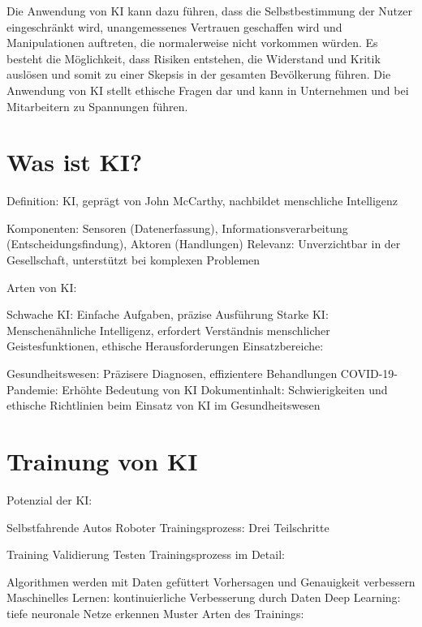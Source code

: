 \documentclass{article}
\begin{document}
\vspace{2mm}Die Anwendung von KI kann dazu führen, dass die Selbstbestimmung der Nutzer eingeschränkt wird, unangemessenes Vertrauen geschaffen wird und Manipulationen auftreten, die normalerweise nicht vorkommen würden. Es besteht die Möglichkeit, dass Risiken entstehen, die Widerstand und Kritik auslösen und somit zu einer Skepsis in der gesamten Bevölkerung führen. Die Anwendung von KI stellt ethische Fragen dar und kann in Unternehmen und bei Mitarbeitern zu Spannungen führen.



\section{Was ist KI?}

\vspace{2mm}Definition: KI, geprägt von John McCarthy, nachbildet menschliche Intelligenz

\vspace{2mm}Komponenten: Sensoren (Datenerfassung), Informationsverarbeitung (Entscheidungsfindung), Aktoren (Handlungen)
Relevanz: Unverzichtbar in der Gesellschaft, unterstützt bei komplexen Problemen

\vspace{2mm}Arten von KI:

\vspace{2mm}Schwache KI: Einfache Aufgaben, präzise Ausführung
Starke KI: Menschenähnliche Intelligenz, erfordert Verständnis menschlicher Geistesfunktionen, ethische Herausforderungen
Einsatzbereiche:

\vspace{2mm}Gesundheitswesen: Präzisere Diagnosen, effizientere Behandlungen
COVID-19-Pandemie: Erhöhte Bedeutung von KI
Dokumentinhalt: Schwierigkeiten und ethische Richtlinien beim Einsatz von KI im Gesundheitswesen



\section{Trainung von KI}
Potenzial der KI:

\vspace{2mm}Selbstfahrende Autos
Roboter
Trainingsprozess: Drei Teilschritte

\vspace{2mm}Training
Validierung
Testen
Trainingsprozess im Detail:

\vspace{2mm}Algorithmen werden mit Daten gefüttert
Vorhersagen und Genauigkeit verbessern
Maschinelles Lernen: kontinuierliche Verbesserung durch Daten
Deep Learning: tiefe neuronale Netze erkennen Muster
Arten des Trainings:
\end{document}
